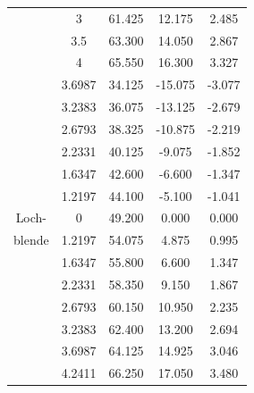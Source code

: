\documentclass[12pt,a4paper,titlepage,headinclude,bibtotoc]{scrartcl}
\begin{document}
\begin{table}[!htb]
\begin{tabular}{|c||c|c|c|c|}
		&	3	&	61.425	&	12.175	&	2.485	\\
		&	3.5	&	63.300	&	14.050	&	2.867	\\
		&	4	&	65.550	&	16.300	&	3.327	\\
		\hline
		&	3.6987	&	34.125	&	-15.075	&	-3.077	\\
		&	3.2383	&	36.075	&	-13.125	&	-2.679	\\
		&	2.6793	&	38.325	&	-10.875	&	-2.219	\\
		&	2.2331	&	40.125	&	-9.075	&	-1.852	\\
		&	1.6347	&	42.600	&	-6.600	&	-1.347	\\
		&	1.2197	&	44.100	&	-5.100	&	-1.041	\\
		Loch- &	0	&	49.200	&	0.000	&	0.000	\\
		blende &	1.2197	&	54.075	&	4.875	&	0.995	\\
		&	1.6347	&	55.800	&	6.600	&	1.347	\\
		&	2.2331	&	58.350	&	9.150	&	1.867	\\
		&	2.6793	&	60.150	&	10.950	&	2.235	\\
		&	3.2383	&	62.400	&	13.200	&	2.694	\\
		&	3.6987	&	64.125	&	14.925	&	3.046	\\
		&	4.2411	&	66.250	&	17.050	&	3.480	\\
		\hline
	\end{tabular}
\end{table}
\end{document}
